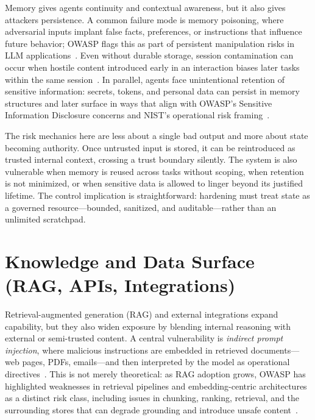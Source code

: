 \begin{TNtwocol}
  Memory gives agents continuity and contextual awareness, but it also gives attackers persistence. A common failure mode is memory poisoning, where adversarial inputs implant false facts, preferences, or instructions that influence future behavior; OWASP flags this as part of persistent manipulation risks in LLM applications~\cite{owasp-top10-llm-2025}. Even without durable storage, session contamination can occur when hostile content introduced early in an interaction biases later tasks within the same session~\cite{owasp-prompt-injection-cheatsheet}. In parallel, agents face unintentional retention of sensitive information: secrets, tokens, and personal data can persist in memory structures and later surface in ways that align with OWASP's Sensitive Information Disclosure concerns and NIST's operational risk framing~\cite{owasp-top10-llm-2025,nist-genai-600-1}.

  \medskip

  The risk mechanics here are less about a single bad output and more about state becoming authority. Once untrusted input is stored, it can be reintroduced as trusted internal context, crossing a trust boundary silently. The system is also vulnerable when memory is reused across tasks without scoping, when retention is not minimized, or when sensitive data is allowed to linger beyond its justified lifetime. The control implication is straightforward: hardening must treat state as a governed resource—bounded, sanitized, and auditable—rather than an unlimited scratchpad.

  \section{Knowledge and Data Surface (RAG, APIs, Integrations)}

  Retrieval-augmented generation (RAG) and external integrations expand capability, but they also widen exposure by blending internal reasoning with external or semi-trusted content. A central vulnerability is \emph{indirect prompt injection}, where malicious instructions are embedded in retrieved documents—web pages, PDFs, emails—and then interpreted by the model as operational directives~\cite{owasp-prompt-injection-cheatsheet}. This is not merely theoretical: as RAG adoption grows, OWASP has highlighted weaknesses in retrieval pipelines and embedding-centric architectures as a distinct risk class, including issues in chunking, ranking, retrieval, and the surrounding stores that can degrade grounding and introduce unsafe content~\cite{owasp-top10-llm-2025}.


\end{TNtwocol}
